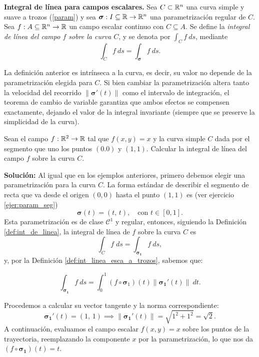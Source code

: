 

\begin{definition}\label{def:int_de_linea}\textbf{Integral de l\'inea para campos escalares.}
    Sea $C\subset \mathbb{R}^n$  una curva simple y suave a trozos  (\ref{param})  y sea $\boldsymbol{\sigma}:I\subseteq\mathbb{R}\to\mathbb{R}^n$ una parametrizaci\'on regular de $C$.   Sea $f:A\subseteq\mathbb{R}^n\to\mathbb{R}$ un campo escalar continuo con $C  \subseteq  A$.   Se define la \emph{integral de l\'inea del campo $f$ sobre la curva} $C$, y se denota por $\int_{C}f\:ds$,  mediante
    \[
        \int_{C}f\:ds= \int_{\boldsymbol{\sigma}}f\:ds. 
    \]
\end{definition}

\begin{obs}\label{obs:param} 
La definición anterior es intrínseca a la curva, es decir, su valor no depende de la parametrización elegida para $C$. Si bien cambiar la parametrización altera tanto la velocidad del recorrido $\|\boldsymbol{\sigma}'(t)\|$ como el intervalo de integración, el teorema de cambio de variable garantiza que ambos efectos se compensen exactamente, dejando el valor de la integral invariante (siempre que se preserve la simplicidad de la curva).
\end{obs}

\begin{example}\label{ej:indep_param} Sean el campo $f: \mathbb{R}^{2}\to\mathbb{R}$ tal que $f(x,y)=x$ y la curva simple $C$  dada por el segmento que uno los puntos $(0.0)$ y $(1,1)$.  Calcular la integral de l\'inea del campo $f$ sobre la curva $C$.
 \end{example} 
  
\noindent\textbf{Solución:} Al igual que en los ejemplos anteriores, primero debemos elegir una parametrización para la curva $C$. La forma estándar de describir el segmento  de recta que va desde el origen $(0,0)$ hasta el punto $(1,1)$ es  (ver ejercicio \ref{ejer:param_seg})
\[
\boldsymbol{\sigma}(t) = (t,\, t), \quad \text{con } t \in [0,1].
\]
Esta parametrización es de clase $\mathcal{C}^1$ y regular, entonces, siguiendo  la Definici\'on \ref{def:int_de_linea},  la integral de l\'inea de $f$ sobre la curva $C$ es
    \[
        \int_C f\;ds=  \int_{\boldsymbol{\sigma_1}}f\:ds,  
    \]
y, por la Definici\'on  \ref{def:int_linea_esca_a_trozos}, sabemos que:

\[
\int_{\boldsymbol{\sigma_1}}f\:ds = \int_0^1 (f \circ\boldsymbol{\sigma}_1) (t)\|\boldsymbol{\sigma_1}'(t)\|\:dt.
 \]
    

Procedemos a calcular su vector tangente y la norma correspondiente:
\[
\boldsymbol{\sigma_1}'(t) = (1,\, 1) \implies \|\boldsymbol{\sigma_1}'(t)\| = \sqrt{1^2 + 1^2} = \sqrt{2}.
\]
A continuación, evaluamos el campo escalar $f(x,y) = x$ sobre los puntos de la trayectoria, reemplazando la componente $x$ por la parametrización, lo que nos da $(f \circ \boldsymbol{\sigma_1})(t) = t$.


